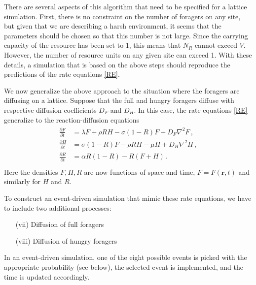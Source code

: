 \documentclass[11pt]{iopart}
\begin{document}
There are several aspects of this algorithm that need to be specified for a
lattice simulation.  First, there is no constraint on the number of foragers
on any site, but given that we are describing a harsh environment, it seems
that the parameters should be chosen so that this number is not large.  Since
the carrying capacity of the resource has been set to 1, this means that
$N_R$ cannot exceed $V$.  However, the number of resource units on any given
site can exceed 1.  With these details, a simulation that is based on the
above steps should reproduce the predictions of the rate equations
\eqref{RE}.

We now generalize the above approach to the situation where the foragers are
diffusing on a lattice.  Suppose that the full and hungry foragers diffuse
with respective diffusion coefficients $D_F$ and $D_H$.  In this case, the
rate equations \eqref{RE} generalize to the reaction-diffusion equations
\begin{align}
  \label{pde}
\begin{split}
\frac{\partial F}{\partial t} &= \lambda F + \rho  RH - \sigma (1-R)F+D_F\nabla^2F\,,\\[0.125in]
\frac{\partial H}{\partial t}  &= \sigma (1-R)F - \rho RH - \mu H+D_H\nabla^2H\,, \\[0.125in]
\frac{\partial R}{\partial t}  &= \alpha R(1-R) -  R(F+H)\,.\\
\end{split}
\end{align}
Here the densities $F,H,R$ are now functions of space and time,
$F=F(\mathbf{r},t)$ and similarly for $H$ and $R$.

To construct an event-driven simulation that mimic these rate equations, we
have to include two additional processes:
\begin{enumerate}
\item[(vii)] Diffusion of full foragers
\item[(viii)] Diffusion of hungry foragers
\end{enumerate}
In an event-driven simulation, one of the eight possible events is picked
with the appropriate probability (see below), the selected event is
implemented, and the time is updated accordingly.
\end{document}

